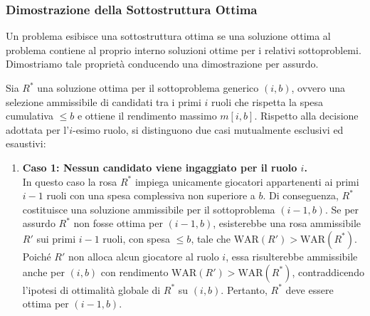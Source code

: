 \subsubsection{Dimostrazione della Sottostruttura Ottima}
Un problema esibisce una sottostruttura ottima se una soluzione ottima al problema contiene al proprio interno soluzioni ottime per i relativi sottoproblemi. Dimostriamo tale proprietà conducendo una dimostrazione per assurdo.

Sia $R^*$ una soluzione ottima per il sottoproblema generico $(i, b)$, ovvero una selezione ammissibile di candidati tra i primi $i$ ruoli che rispetta la spesa cumulativa $\le b$ e ottiene il rendimento massimo $m[i, b]$. Rispetto alla decisione adottata per l'$i$-esimo ruolo, si distinguono due casi mutualmente esclusivi ed esaustivi:
\begin{enumerate}
	\item \textbf{Caso 1: Nessun candidato viene ingaggiato per il ruolo $i$.} \\
	      In questo caso la rosa $R^*$ impiega unicamente giocatori appartenenti ai primi $i-1$ ruoli con una spesa complessiva non superiore a $b$. Di conseguenza, $R^*$ costituisce una soluzione ammissibile per il sottoproblema $(i-1, b)$. Se per assurdo $R^*$ non fosse ottima per $(i-1, b)$, esisterebbe una rosa ammissibile $R'$ sui primi $i-1$ ruoli, con spesa $\le b$, tale che $\text{WAR}(R') > \text{WAR}(R^*)$. Poiché $R'$ non alloca alcun giocatore al ruolo $i$, essa risulterebbe ammissibile anche per $(i, b)$ con rendimento $\text{WAR}(R') > \text{WAR}(R^*)$, contraddicendo l'ipotesi di ottimalità globale di $R^*$ su $(i, b)$. Pertanto, $R^*$ deve essere ottima per $(i-1, b)$.


\end{enumerate}
